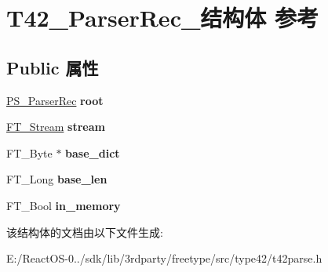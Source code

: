 \hypertarget{struct_t42___parser_rec__}{}\section{T42\+\_\+\+Parser\+Rec\+\_\+结构体 参考}
\label{struct_t42___parser_rec__}
\subsection*{Public 属性}
\begin{DoxyCompactItemize}
\item 
\mbox{\label{struct_t42___parser_rec___aee44d4d0e5fd767c7e6e1a8fcbe3d33f}} 
\hyperlink{struct_p_s___parser_rec__}{P\+S\+\_\+\+Parser\+Rec} {\bfseries root}
\item 
\mbox{\label{struct_t42___parser_rec___a8859f0cdbb370a4dd0230cc2954cec84}} 
\hyperlink{struct_f_t___stream_rec__}{F\+T\+\_\+\+Stream} {\bfseries stream}
\item 
\mbox{\label{struct_t42___parser_rec___a488024642128a55e16e2e67dac725690}} 
F\+T\+\_\+\+Byte $\ast$ {\bfseries base\+\_\+dict}
\item 
\mbox{\label{struct_t42___parser_rec___aeb1dd4dfb9c4e5e81a10d9731d58dc3e}} 
F\+T\+\_\+\+Long {\bfseries base\+\_\+len}
\item 
\mbox{\label{struct_t42___parser_rec___aff0398876f4d45b24feb00dc06c124ea}} 
F\+T\+\_\+\+Bool {\bfseries in\+\_\+memory}
\end{DoxyCompactItemize}


该结构体的文档由以下文件生成\+:\begin{DoxyCompactItemize}
\item 
E\+:/\+React\+O\+S-\/0../sdk/lib/3rdparty/freetype/src/type42/t42parse.\+h\end{DoxyCompactItemize}
